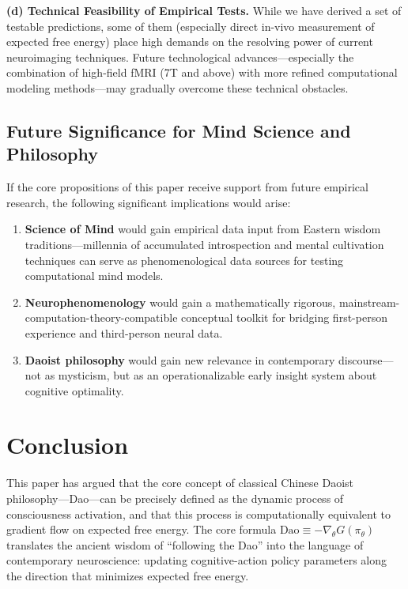 \documentclass[11pt,a4paper]{article}
\begin{document}
\textbf{(d) Technical Feasibility of Empirical Tests.} While we have derived a set of testable predictions, some of them (especially direct in-vivo measurement of expected free energy) place high demands on the resolving power of current neuroimaging techniques. Future technological advances---especially the combination of high-field fMRI (7T and above) with more refined computational modeling methods---may gradually overcome these technical obstacles.

\subsection{Future Significance for Mind Science and Philosophy}

If the core propositions of this paper receive support from future empirical research, the following significant implications would arise:

\begin{enumerate}[nosep]
    \item \textbf{Science of Mind} would gain empirical data input from Eastern wisdom traditions---millennia of accumulated introspection and mental cultivation techniques can serve as phenomenological data sources for testing computational mind models.
    \item \textbf{Neurophenomenology} \cite{Varela1996} would gain a mathematically rigorous, mainstream-computation-theory-compatible conceptual toolkit for bridging first-person experience and third-person neural data.
    \item \textbf{Daoist philosophy} would gain new relevance in contemporary discourse---not as mysticism, but as an operationalizable early insight system about cognitive optimality.
\end{enumerate}

\section{Conclusion}

This paper has argued that the core concept of classical Chinese Daoist philosophy---Dao---can be precisely defined as the dynamic process of consciousness activation, and that this process is computationally equivalent to gradient flow on expected free energy. The core formula $\text{Dao} \equiv -\nabla_\theta G(\pi_\theta)$ translates the ancient wisdom of ``following the Dao'' into the language of contemporary neuroscience: updating cognitive-action policy parameters along the direction that minimizes expected free energy.
\end{document}
